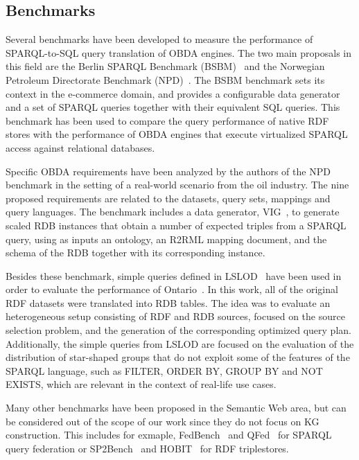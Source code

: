 \subsection{Benchmarks}
\label{chap2:soa-bench}
Several benchmarks have been developed to measure the performance of SPARQL-to-SQL query translation of OBDA engines. The two main proposals in this field are the Berlin SPARQL Benchmark (BSBM)~\citep{bizer2009berlin} and the Norwegian Petroleum Directorate Benchmark (NPD)~\citep{lanti2015npd}. The BSBM benchmark sets its context in the e-commerce domain, and provides a configurable data generator and a set of SPARQL queries together with their equivalent SQL queries. This benchmark has been used to compare the query performance of native RDF stores with the performance of OBDA engines that execute virtualized SPARQL access against relational databases.

Specific OBDA requirements have been analyzed by the authors of the NPD benchmark in the setting of a real-world scenario from the oil industry. The nine proposed requirements are related to the datasets, query sets, mappings and query languages. The benchmark includes a data generator, VIG~\citep{lantivig}, to generate scaled RDB instances that obtain a number of expected triples from a SPARQL query, using as inputs an ontology, an R2RML mapping document, and the schema of the RDB together with its corresponding instance. 

Besides these benchmark, simple queries defined in LSLOD~\citep{hasnain2017biofed} have been used in order to evaluate the performance of Ontario~\citep{endris2019ontario}. In this work, all of the original RDF datasets were translated into RDB tables. The idea was to evaluate an heterogeneous setup consisting of RDF and RDB sources, focused on the source selection problem, and the generation of the corresponding optimized query plan. Additionally, the simple queries from LSLOD are focused on the evaluation of the distribution of star-shaped groups that do not exploit some of the features of the SPARQL language, such as FILTER, ORDER BY, GROUP BY and NOT EXISTS, which are relevant in the context of  real-life use cases.

Many other benchmarks have been proposed in the Semantic Web area, but can be considered out of the scope of our work since they do not focus on KG construction. This includes for exmaple, FedBench~\citep{schmidt2011fedbench} and QFed~\citep{rakhmawati2014qfed} for SPARQL query federation or SP2Bench~\citep{schmidt2009sp} and HOBIT~\citep{roder2020hobbit} for RDF triplestores.

